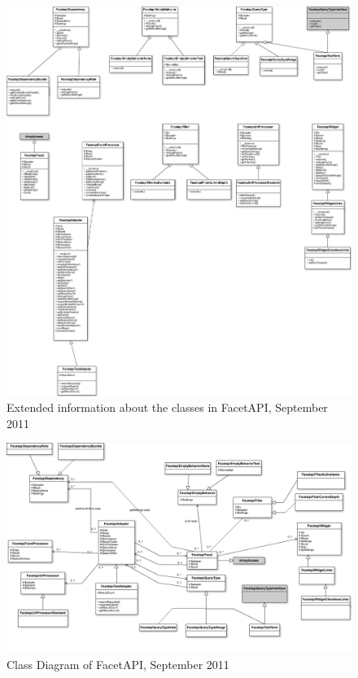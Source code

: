 \begin{figure}[H]
     \includegraphics[width=\textwidth]{images/facetapi_classdiagram.png}
     \caption{Extended information about the classes in FacetAPI, September 2011}
\end{figure}

\begin{figure}[H]
     \includegraphics[width=\textwidth]{images/ClassDiagram_facetapi.png}
     \caption{Class Diagram of FacetAPI, September 2011}
\end{figure}

